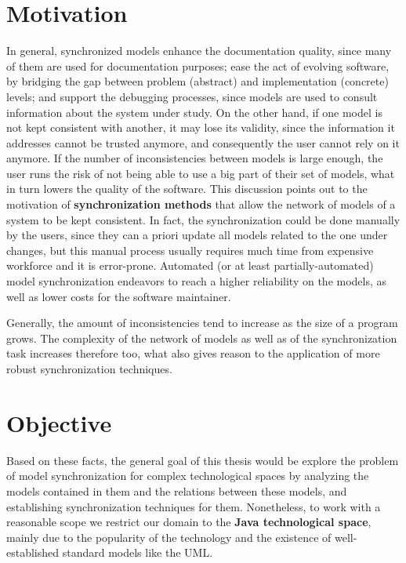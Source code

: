 \documentclass[tuberlin,cic,tc,english,noabntcite, oneside]{iiufrgs}
\begin{document}
\section{Motivation}
In general, synchronized models enhance the documentation quality, since many of them are used for documentation purposes; ease the act of evolving software, by bridging the gap between problem (abstract) and implementation (concrete) levels; and support the debugging processes, since models are used to consult information about the system under study. On the other hand, if one model is not kept consistent with another, it may lose its validity, since the information it addresses cannot be trusted anymore, and consequently the user cannot rely on it anymore. If the number of inconsistencies between models is large enough, the user runs the risk of not being able to use a big part of their set of models, what in turn lowers the quality of the software. This discussion points out to the motivation of \textbf{synchronization methods} that allow the network of models of a system to be kept consistent. In fact, the synchronization could be done manually by the users, since they can a priori update all models related to the one under changes, but this manual process usually requires much time from expensive workforce and it is error-prone. Automated (or at least partially-automated) model synchronization endeavors to reach a higher reliability on the models, as well as lower costs for the software maintainer.

Generally, the amount of inconsistencies tend to increase as the size of a program grows. The complexity of the network of models as well as of the synchronization task increases therefore too, what also gives reason to the application of more robust synchronization techniques. 

\section{Objective}
Based on these facts, the general goal of this thesis would be explore the problem of model synchronization for complex technological spaces by analyzing the models contained in them and the relations between these models, and establishing synchronization techniques for them. Nonetheless, to work with a reasonable scope we restrict our domain to the \textbf{Java technological space}, mainly due to the popularity of the technology and the existence of well-established standard models like the UML.
\end{document}
